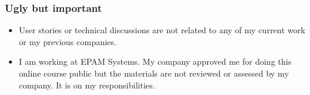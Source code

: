 \begin{frame}[c]
\begin{figure}[ht]
	\end{figure}
\end{frame}



\begin{frame}
\frametitle{Ugly but important}

\begin{itemize}[<+->]
	\item User stories or technical discussions are not related to any of my current work or my previous companies.
	\item I am working at EPAM Systems. My company approved me for doing this online course public but the materials are not reviewed or assessed by my company. It is on my responsibilities.
\end{itemize}
\end{frame}


%	

